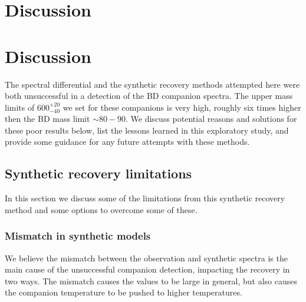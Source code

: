 
\section{Discussion}
\label{sec:chisquared_discussion}




\section{Discussion}
\label{sec:discussion}
The spectral differential and the synthetic recovery methods attempted here were both unsuccessful in a detection of the {BD} companion spectra.
The upper mass limits of \(600^{+20}_{-40}\) we set for these companions is very high, roughly six times higher then the {BD} mass limit \(\sim 80-90\)\Mjup{}.
We discuss potential reasons and solutions for these poor results below, list the lessons learned in this exploratory study, and provide some guidance for any future attempts with these methods.


\subsection{Synthetic recovery limitations}
\label{subsec:limitations}
In this section we discuss some of the limitations from this synthetic recovery method and some options to overcome some of these.

\subsubsection{Mismatch in synthetic models}
\label{subsubsec:mismatch}
We believe the mismatch between the observation and synthetic spectra is the main cause of the unsuccessful companion detection, impacting the recovery in two ways.
The mismatch causes the \textchisquared{} values to be large in general, but also causes the companion temperature to be pushed to higher temperatures.

